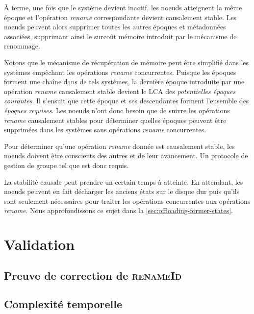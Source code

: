 \documentclass[12pt]{thesul}
\begin{document}
À terme, une fois que le système devient inactif, les noeuds atteignent la même époque et l'opération \emph{rename} correspondante devient causalement stable.
Les noeuds peuvent alors supprimer toutes les autres époques et métadonnées associées, supprimant ainsi le surcoût mémoire introduit par le mécanisme de renommage.

Notons que le mécanisme de récupération de mémoire peut être simplifié dans les systèmes empêchant les opérations \emph{rename} concurrentes.
Puisque les époques forment une chaîne dans de tels systèmes, la dernière époque introduite par une opération \emph{rename} causalement stable devient le \ac{LCA} des \emph{potentielles époques courantes}.
Il s'ensuit que cette époque et ses descendantes forment l'ensemble des \emph{époques requises}.
Les noeuds n'ont donc besoin que de suivre les opérations \emph{rename} causalement stables pour déterminer quelles époques peuvent être supprimées dans les systèmes sans opérations \emph{rename} concurrentes.

Pour déterminer qu'une opération \emph{rename} donnée est causalement stable, les noeuds doivent être conscients des autres et de leur avancement.
Un protocole de gestion de groupe tel que \cite{swim2002,lifeguard2018} est donc requis.

La stabilité causale peut prendre un certain temps à atteinte.
En attendant, les noeuds peuvent en fait décharger les anciens états sur le disque dur puis qu'ils sont seulement nécessaires pour traiter les opérations concurrentes aux opérations \emph{rename}.
Nous approfondissons ce sujet dans la \autoref{sec:offloading-former-states}.

\section{Validation}

\subsection{Preuve de correction de \textsc{renameId}}

\subsection{Complexité temporelle}
\end{document}
